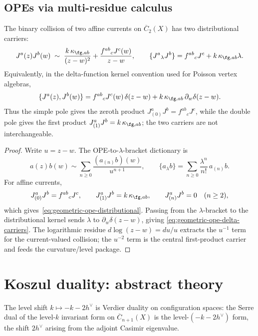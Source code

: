 \subsection{OPEs via multi-residue calculus}

\begin{theorem}\label{thm:geometric-ope-kac-moody}
The binary collision of two affine currents on
\(\overline{C}_2(X)\) has two distributional carriers:
\begin{equation}\label{eq:geometric-ope-distributional}
J^a(z)J^b(w)
\;\sim\;
\frac{k\,\kappa_{\fg,ab}}{(z-w)^2}
+\frac{f^{ab}{}_{c}J^c(w)}{z-w},
\qquad
\{J^a{}_\lambda J^b\}
= f^{ab}{}_{c}J^c+k\,\kappa_{\fg,ab}\lambda .
\end{equation}
Equivalently, in the delta-function kernel convention used for
Poisson vertex algebras,
\begin{equation}\label{eq:geometric-ope-delta-carriers}
\{J^a(z),J^b(w)\}
= f^{ab}{}_{c}J^c(w)\,\delta(z-w)
+k\,\kappa_{\fg,ab}\,\partial_w\delta(z-w).
\end{equation}
Thus the simple pole gives the zeroth product
\(J^a_{(0)}J^b=f^{ab}{}_{c}J^c\), while the double pole gives the
first product \(J^a_{(1)}J^b=k\,\kappa_{\fg,ab}\); the two carriers
are not interchangeable.
\end{theorem}

\begin{proof}
Write \(u=z-w\). The OPE-to-\(\lambda\)-bracket dictionary is
\[
a(z)b(w)\sim \sum_{n\ge0}\frac{(a_{(n)}b)(w)}{u^{n+1}},
\qquad
\{a_\lambda b\}=\sum_{n\ge0}\frac{\lambda^n}{n!}\,a_{(n)}b .
\]
For affine currents,
\[
J^a_{(0)}J^b=f^{ab}{}_{c}J^c,\qquad
J^a_{(1)}J^b=k\,\kappa_{\fg,ab},\qquad
J^a_{(n)}J^b=0\quad(n\ge2),
\]
which gives~\eqref{eq:geometric-ope-distributional}. Passing from the
\(\lambda\)-bracket to the distributional kernel sends
\(\lambda\) to \(\partial_w\delta(z-w)\), giving
\eqref{eq:geometric-ope-delta-carriers}. The logarithmic residue
\(d\log(z-w)=du/u\) extracts the \(u^{-1}\) term for the
current-valued collision; the \(u^{-2}\) term is the central
first-product carrier and feeds the curvature/level package.
\end{proof}

\section{Koszul duality: abstract theory}
\label{sec:km-koszul-abstract}

The level shift $k \mapsto -k - 2h^\vee$ is Verdier duality on configuration spaces: the Serre dual of the level-$k$ invariant form on $\overline{C}_{n+1}(X)$ is the level-$(-k-2h^\vee)$ form, the shift $2h^\vee$ arising from the adjoint Casimir eigenvalue.


